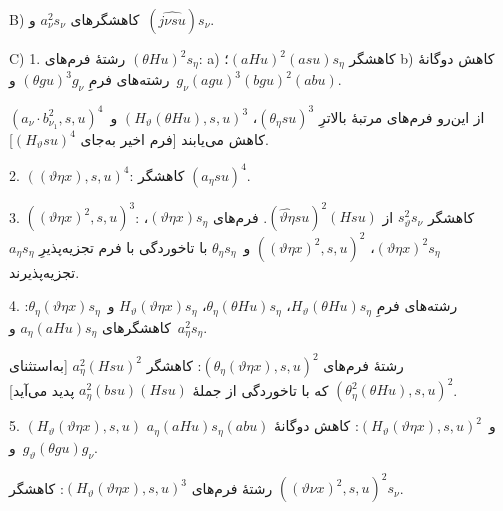 \documentclass[11pt]{article}
\begin{document}
B) کاهشگرهای $a_\nu^2s_\nu$ و~$(\widehat{j\nu su})s_\nu$.

C) 1. رشتهٔ فرم‌های $(\theta Hu)^2s_\eta$: a) کاهشگر $(aHu)^2(asu)s_\eta$؛ b) کاهش دوگانهٔ رشته‌های فرمِ $(\theta gu)^3g_\nu$ و~$g_\nu(agu)^3(bgu)^2(abu)$.

از این‌رو فرم‌های مرتبهٔ بالاترِ $(\theta_\eta su)^3$، $(H_\vartheta(\theta Hu),s,u)^3$ و~$(a_\nu\cdot b_{\nu_1}^2,s,u)^4$ کاهش می‌یابند [فرم اخیر به‌جای $(H_\vartheta su)^4$].

2. $((\vartheta\eta x),s,u)^4$: کاهشگر $(a_\eta su)^4$.

3. $((\vartheta\eta x)^2,s,u)^3$: کاهشگر $s_\vartheta^2s_\nu$ از $(\widehat{\vartheta\eta}su)^2(Hsu)$.
فرم‌های $(\vartheta\eta x)s_\eta$، $(\vartheta\eta x)^2s_\eta$، $((\vartheta\eta x)^2,s,u)^2$ و~$\theta_\eta s_\eta$ با تاخوردگی با فرم تجزیه‌پذیرِ $a_\eta s_\eta$ تجزیه‌پذیرند.

4. رشته‌های فرمِ $H_\vartheta(\theta Hu)s_\eta$، $\theta_\eta(\theta Hu)s_\eta$، $H_\vartheta(\vartheta\eta x)s_\eta$ و~$\theta_\eta(\vartheta\eta x)s_\eta$:
کاهشگرهای $a_\eta(aHu)s_\eta$ و~$a_\eta^2s_\eta$.

رشتهٔ فرم‌های $(\theta_\eta(\vartheta\eta x),s,u)^2$: کاهشگر $a_\eta^2(Hsu)^2$ [به‌استثنای $(\theta_\eta^2(\theta Hu),s,u)^2$ که با تاخوردگی از جملهٔ $a_\eta^2(bsu)(Hsu)$ پدید می‌آید].

5. $(H_\vartheta(\vartheta\eta x),s,u)$ و~$(H_\vartheta(\vartheta\eta x),s,u)^2$: کاهش دوگانهٔ $a_\eta(aHu)s_\eta(abu)$ و~$g_\vartheta(\theta gu)g_\nu$.

رشتهٔ فرم‌های $(H_\vartheta(\vartheta\eta x),s,u)^3$: کاهشگر $((\vartheta \nu x)^2,s,u)^2s_\nu$.
\end{document}
